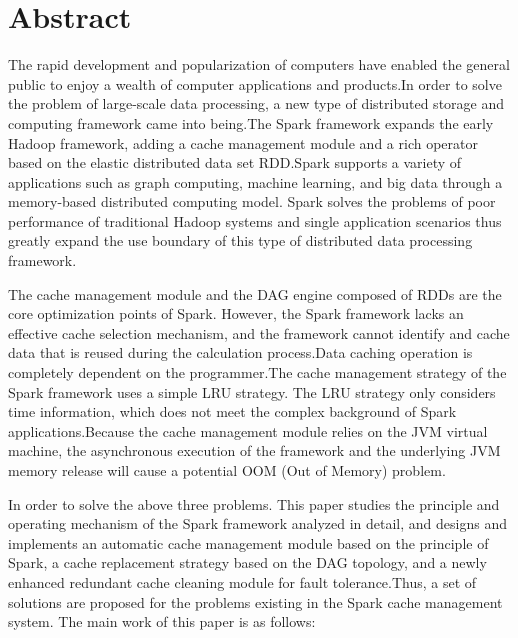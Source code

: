 \intobmk\chapter*{Abstract}%

The rapid development and popularization of computers have enabled the general public to enjoy a wealth of computer applications and products.In order to solve the problem of large-scale data processing, a new type of distributed storage and computing framework came into being.The Spark framework expands the early Hadoop framework, adding a cache management module and a rich operator based on the elastic distributed data set RDD.Spark supports a variety of applications such as graph computing, machine learning, and big data through a memory-based distributed computing model. Spark solves the problems of poor performance of traditional Hadoop systems and single application scenarios thus greatly expand the use boundary of this type of distributed data processing framework.

The cache management module and the DAG engine composed of RDDs are the core optimization points of Spark. However, the Spark framework lacks an effective cache selection mechanism, and the framework cannot identify and cache data that is reused during the calculation process.Data caching operation is completely dependent on the programmer.The cache management strategy of the Spark framework uses a simple LRU strategy. The LRU strategy only considers time information, which does not meet the complex background of Spark applications.Because the cache management module relies on the JVM virtual machine, the asynchronous execution of the framework and the underlying JVM memory release will cause a potential OOM (Out of Memory) problem.

In order to solve the above three problems. This paper studies the principle and operating mechanism of the Spark framework analyzed in detail, and designs and implements an automatic cache management module based on the principle of Spark, a cache replacement strategy based on the DAG topology, and a newly enhanced redundant cache cleaning module for fault tolerance.Thus, a set of solutions are proposed for the problems existing in the Spark cache management system. The main work of this paper is as follows:

